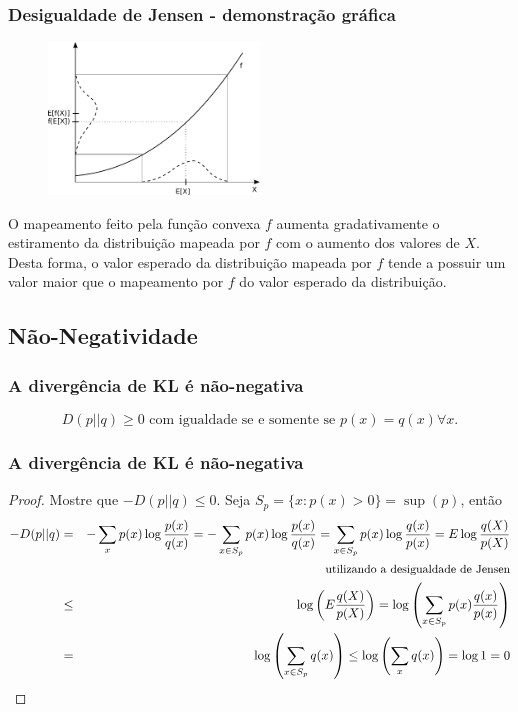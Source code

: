 \begin{frame}%
  \frametitle{Desigualdade de Jensen - demonstração gráfica}

  \vspace{-0.2cm}
  \begin{figure}[h!]
  \centering
  \includegraphics[width=0.5\textwidth]{images/jensen.pdf}
  \label{fig:jensen}
  \end{figure} 

  \vspace{-0.2cm}
  O mapeamento feito pela função convexa $f$ aumenta gradativamente o estiramento
  da distribuição mapeada por $f$ com o aumento dos valores de $X$.
  Desta forma, o valor esperado da distribuição mapeada por $f$ tende a possuir
  um valor maior que o mapeamento por $f$ do valor esperado da distribuição.
\end{frame}


\subsection{Não-Negatividade}
\begin{frame}%
  \frametitle{A divergência de KL é não-negativa}
  \begin{lemma} 
  \begin{equation}
  D(p||q) \geq 0 \text{ com igualdade se e somente se } p(x) = q(x) \forall x.
  \end{equation}
  \end{lemma}
\end{frame}

\begin{frame}%
  \frametitle{A divergência de KL é não-negativa} 
  \begin{proof}
  Mostre que $-D(p||q) \leq 0$. Seja $S_p=\{x: p(x) > 0\} = \sup (p)$, então
  \begin{eqnarray}
  -D(p||q) &=& -\sum_x p(x) \log \frac{p(x)}{q(x)} = -\sum_{x \in S_p} p(x) \log \frac{p(x)}{q(x)} %
        = \sum_{x \in S_p} p(x) \log \frac{q(x)}{p(x)} = E \log \frac{q(X)}{p(X)} \nonumber \\
        && {\small \text{utilizando a desigualdade de Jensen}} \nonumber \\
        &\leq& \log \left( E \frac{q(X)}{p(X)} \right) = \log \left( \sum_{x \in S_p} p(x) \frac{q(x)}{p(x)} \right) \nonumber \\
        &=& \log \left( \sum_{x \in S_p} q(x) \right) \leq \log \left( \sum_x  q(x) \right) = \log 1 = 0
  \end{eqnarray}
  \end{proof}
\end{frame}

